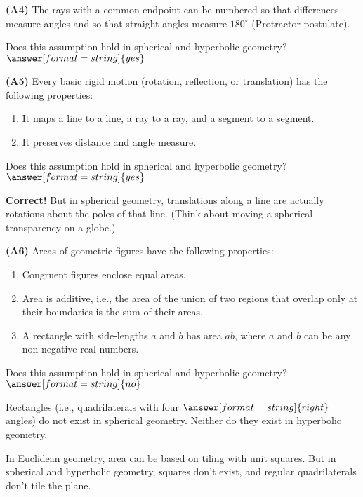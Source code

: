\documentclass[nooutcomes]{ximera}
\begin{document}
\begin{problem}
\textbf{(A4)} The rays with a common endpoint can be numbered so that differences measure angles and so that straight angles measure $180^\circ$ (Protractor postulate). 

Does this assumption hold in spherical and hyperbolic geometry? 
$\answer[format=string]{yes}$
\end{problem}

\begin{problem}
\textbf{(A5)} Every basic rigid motion (rotation, reflection, or translation) has the following properties:
\begin{enumerate}
\item It maps a line to a line, a ray to a ray, and a segment to a segment.
\item It preserves distance and angle measure.
\end{enumerate}

Does this assumption hold in spherical and hyperbolic geometry? 
$\answer[format=string]{yes}$
\begin{feedback}
\textbf{Correct!} But in spherical geometry, translations along a line are actually rotations about the poles of that line.  (Think about moving a spherical transparency on a globe.) 
\end{feedback}
\end{problem}

\begin{problem}
\textbf{(A6)} Areas of geometric figures have the following properties: 
\begin{enumerate}
\item Congruent figures enclose equal areas.
\item Area is additive, i.e., the area of the union of two regions that overlap only at their boundaries is the sum of their areas. 
\item A rectangle with side-lengths $a$ and $b$ has area $ab$, where $a$ and $b$ can be any non-negative real numbers.
\end{enumerate}

Does this assumption hold in spherical and hyperbolic geometry? 
$\answer[format=string]{no}$
\begin{problem}
Rectangles (i.e., quadrilaterals with four $\answer[format=string]{right}$ angles) do not exist in spherical geometry.  Neither do they exist in hyperbolic geometry.  

In Euclidean geometry, area can be based on tiling with unit squares.  But in spherical and hyperbolic geometry, squares don't exist, and regular quadrilaterals don't tile the plane.
\end{problem}
\end{problem}
\end{document}
